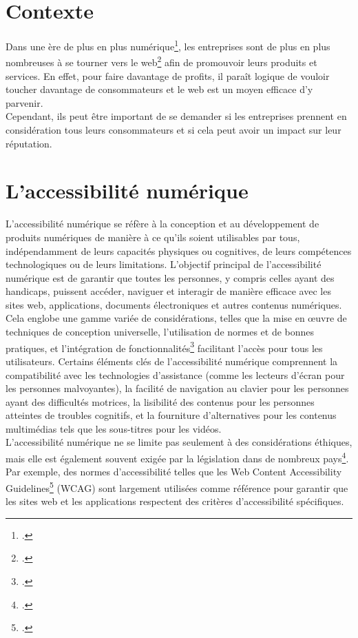 \documentclass[12pt, a4paper]{report}
\begin{document}
\section{Contexte}

Dans une ère de plus en plus numérique\footcite{noauthor_ere_2023}, les entreprises sont de plus en plus nombreuses à se tourner vers le web\footcite{noauthor_total_nodate} afin de promouvoir leurs produits et services. En effet, pour faire davantage de profits, il paraît logique de vouloir toucher davantage de consommateurs et le web est un moyen efficace d'y parvenir.\\

Cependant, ils peut être important de se demander si les entreprises prennent en considération tous leurs consommateurs et si cela peut avoir un impact sur leur réputation.

\section{L'accessibilité numérique}

L'accessibilité numérique se réfère à la conception et au développement de produits numériques de manière à ce qu'ils soient utilisables par tous, indépendamment de leurs capacités physiques ou cognitives, de leurs compétences technologiques ou de leurs limitations. L'objectif principal de l'accessibilité numérique est de garantir que toutes les personnes, y compris celles ayant des handicaps, puissent accéder, naviguer et interagir de manière efficace avec les sites web, applications, documents électroniques et autres contenus numériques.\\

Cela englobe une gamme variée de considérations, telles que la mise en œuvre de techniques de conception universelle, l'utilisation de normes et de bonnes pratiques, et l'intégration de fonctionnalités\footcite{alajarmeh_non-visual_2021} facilitant l'accès pour tous les utilisateurs. Certains éléments clés de l'accessibilité numérique comprennent la compatibilité avec les technologies d'assistance (comme les lecteurs d'écran pour les personnes malvoyantes), la facilité de navigation au clavier pour les personnes ayant des difficultés motrices, la lisibilité des contenus pour les personnes atteintes de troubles cognitifs, et la fourniture d'alternatives pour les contenus multimédias tels que les sous-titres pour les vidéos.\\

L'accessibilité numérique ne se limite pas seulement à des considérations éthiques, mais elle est également souvent exigée par la législation dans de nombreux pays\footcite{noauthor_accessibilite_nodate}. Par exemple, des normes d'accessibilité telles que les Web Content Accessibility Guidelines\footcite{noauthor_criteres_nodate} (WCAG) sont largement utilisées comme référence pour garantir que les sites web et les applications respectent des critères d'accessibilité spécifiques.\\
\end{document}
